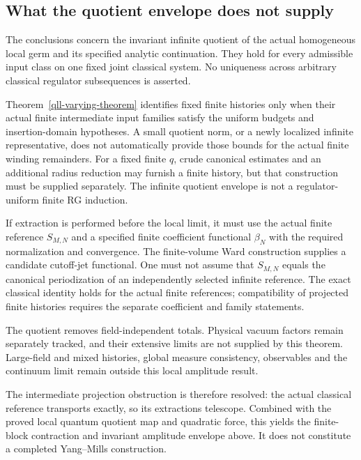 \subsection{What the quotient envelope does not supply}
\label{eqr-scope-section}

The conclusions concern the invariant infinite quotient of
the actual homogeneous local germ and its specified analytic
continuation. They hold for every admissible input class
on one fixed joint classical system. No uniqueness across
arbitrary classical regulator subsequences is asserted.

Theorem~\ref{qll-varying-theorem} identifies fixed finite
histories only when their actual finite intermediate input
families satisfy the uniform budgets and insertion-domain
hypotheses. A small quotient norm, or a newly localized
infinite representative, does not automatically provide those
bounds for the actual finite winding remainders. For a fixed
finite $q$, crude canonical estimates and an additional radius
reduction may furnish a finite history, but that construction
must be supplied separately. The infinite quotient envelope
is not a regulator-uniform finite RG induction.

If extraction is performed before the local limit, it must
use the actual finite reference $S_{M,N}$ and a specified
finite coefficient functional $\beta_N$ with the required
normalization and convergence. The finite-volume Ward
construction supplies a candidate cutoff-jet functional.
One must not assume that $S_{M,N}$ equals the canonical
periodization of an independently selected infinite reference.
The exact classical identity holds for the actual finite
references; compatibility of projected finite histories
requires the separate coefficient and family statements.

The quotient removes field-independent totals. Physical
vacuum factors remain separately tracked, and their
extensive limits are not supplied by this theorem.
Large-field and mixed histories, global measure consistency,
observables and the continuum limit remain outside this
local amplitude result.

The intermediate projection obstruction is therefore resolved:
the actual classical reference transports exactly, so its
extractions telescope. Combined with the proved local quantum
quotient map and quadratic force, this yields the finite-block
contraction and invariant amplitude envelope above. It does
not constitute a completed Yang--Mills construction.
